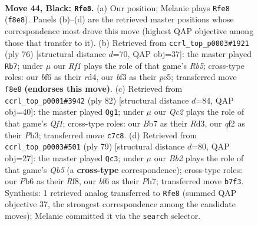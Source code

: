\documentclass[11pt]{article}
\begin{document}
\clearpage

\begin{figure}[p]\centering
\begin{subfigure}{0.46\textwidth}\centering
\resizebox{\linewidth}{!}{%
\newchessgame
\chessboard[
  setfen={1r3r2/Rbq2p1k/1p3Bp1/8/7P/1P3B2/2PN1Q2/R5K1 b - - 2 44},
  showmover=false,
  pgfstyle=straightmove, color=movearrow, markmove={f8-e8}
]}
\caption{}
\end{subfigure}\hfill
\begin{subfigure}{0.46\textwidth}\centering
\resizebox{\linewidth}{!}{%
\newchessgame
\chessboard[
  setfen={8/4b1rk/5pq1/1R2p3/3r4/P5B1/1P2Q1RP/7K w - - 1 39},
  showmover=false,
  pgfstyle=straightmove, color=movearrow, markmove={b5-b7}
]}
\caption{}
\end{subfigure}
\\[4pt]
\begin{subfigure}{0.46\textwidth}\centering
\resizebox{\linewidth}{!}{%
\newchessgame
\chessboard[
  setfen={2r3k1/7p/p5p1/1r2Pp2/1bqp1P2/3R3P/5BPK/3R1Q2 w - - 6 42},
  showmover=false,
  pgfstyle=straightmove, color=movearrow, markmove={f1-g1}
]}
\caption{}
\end{subfigure}\hfill
\begin{subfigure}{0.46\textwidth}\centering
\resizebox{\linewidth}{!}{%
\newchessgame
\chessboard[
  setfen={4rr1k/6pp/5p2/8/nqpR2B1/7P/5PP1/QR4K1 b - - 11 40},
  showmover=false,
  pgfstyle=straightmove, color=movearrow, markmove={b4-c3}
]}
\caption{}
\end{subfigure}
\caption{\textbf{Move 44, Black: \texttt{Rfe8}.} (a) Our position; Melanie plays \texttt{Rfe8} (\texttt{f8e8}). Panels (b)--(d) are the retrieved master positions whose correspondence most drove this move (highest QAP objective among those that transfer to it). (b) Retrieved from \texttt{ccrl\_top\_p0003\#1921} (ply 76) [structural distance $d$=70, QAP obj=37]: the master played \texttt{Rb7}; under $\mu$ our \emph{Rf1} plays the role of that game's \emph{Rb5}; cross-type roles: our \emph{b}f6 as their \emph{r}d4, our \emph{b}f3 as their \emph{p}e5; transferred move \texttt{f8e8} \textbf{(endorses this move)}. (c) Retrieved from \texttt{ccrl\_top\_p0001\#3942} (ply 82) [structural distance $d$=84, QAP obj=40]: the master played \texttt{Qg1}; under $\mu$ our \emph{Qc2} plays the role of that game's \emph{Qf1}; cross-type roles: our \emph{B}b7 as their \emph{R}d3, our \emph{q}f2 as their \emph{P}h3; transferred move \texttt{c7c8}. (d) Retrieved from \texttt{ccrl\_top\_p0003\#501} (ply 79) [structural distance $d$=80, QAP obj=27]: the master played \texttt{Qc3}; under $\mu$ our \emph{Bb2} plays the role of that game's \emph{Qb5} (a \textbf{cross-type} correspondence); cross-type roles: our \emph{P}b6 as their \emph{R}f8, our \emph{b}f6 as their \emph{P}h7; transferred move \texttt{b7f3}. Synthesis: 1 retrieved analog transferred to \texttt{Rfe8} (summed QAP objective 37, the strongest correspondence among the candidate moves); Melanie committed it via the \texttt{search} selector.}
\label{fig:thought-m87}
\end{figure}
\end{document}
